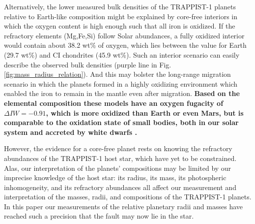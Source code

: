 \documentclass[twocolumn]{aastex63}
\begin{document}

Alternatively, the lower measured bulk densities of the TRAPPIST-1 planets relative to Earth-like composition might be explained by core-free interiors \citep{ElkinsTanton2008} in which the oxygen content is high enough such that all iron is oxidized. If the refractory elements (Mg,Fe,Si) follow Solar abundances, a fully oxidized interior would contain about 38.2 wt\% of oxygen, which lies between the value for Earth (29.7 wt\%) and CI chondrites (45.9 wt\%). Such an interior scenario can easily describe the observed bulk densities (purple line in Fig. \ref{fig:mass_radius_relation}).  And this may bolster the long-range migration scenario in which the planets formed in a highly oxidizing environment which enabled the iron to remain in the mantle even after migration.  \textbf{Based on the elemental composition these models have an oxygen fugacity of $\Delta IW = -0.91$, which is more oxidized than Earth or even Mars, but is comparable to the oxidation state of small bodies, both in our solar system and accreted by white dwarfs \citep{Doyle2019}.}

However, the evidence for a core-free planet rests on knowing the refractory abundances of the TRAPPIST-1 host star, which have yet to be constrained.  Alas, our interpretation of the planets' compositions may be limited by our imprecise knowledge of the host star:  its radius, its mass, its photospheric inhomogeneity, and its refractory abundances all affect our measurement and interpretation of the masses, radii, and compositions of the TRAPPIST-1 planets.  In this paper our measurements of the relative planetary radii and masses have reached such a precision that the fault may now lie in the star.
\end{document}
